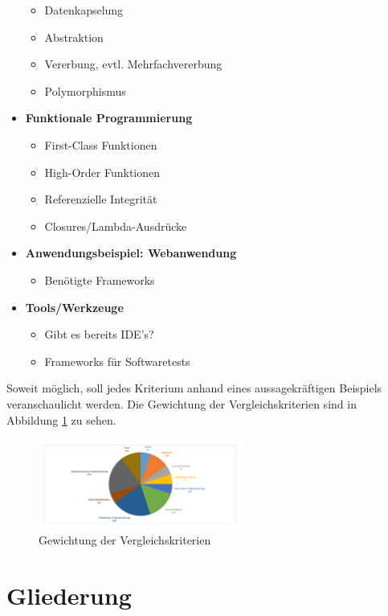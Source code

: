 \documentclass[
    paper=a4,
    bibtotocnumbered,
    liststotocnumbered,
    oneside,
    12pt,
    listof=totoc,
    toc=chapterentrywithdots,
    listof=entryprefix,
]{scrartcl}
\begin{document}
\begin{itemize}
\begin{itemize}
        \item Datenkapselung
        \item Abstraktion
        \item Vererbung, evtl. Mehrfachvererbung
        \item Polymorphismus
    \end{itemize}
    \item \textbf{Funktionale Programmierung}
    \begin{itemize}
      \item First-Class Funktionen
      \item High-Order Funktionen
      \item Referenzielle Integrität
      \item Closures/Lambda-Ausdrücke
    \end{itemize}
  \item \textbf{Anwendungsbeispiel: Webanwendung}
  \begin{itemize}
    \item Benötigte Frameworks
  \end{itemize}
  \item \textbf{Tools/Werkzeuge}
  \begin{itemize}
    \item Gibt es bereits IDE's?
    \item Frameworks für Softwaretests
  \end{itemize}
\end{itemize}

Soweit möglich, soll jedes Kriterium anhand eines aussagekräftigen Beispiels veranschaulicht werden.
Die Gewichtung der Vergleichskriterien sind in Abbildung \ref{figure:gewichtung} zu sehen.

	\begin{figure}[h]
	\centering
	\includegraphics[width=0.6\textwidth]{Images/gewichtung}
	\caption{Gewichtung der Vergleichskriterien}%
	\label{figure:gewichtung}%
	\end{figure}

\section{Gliederung}
\end{document}
